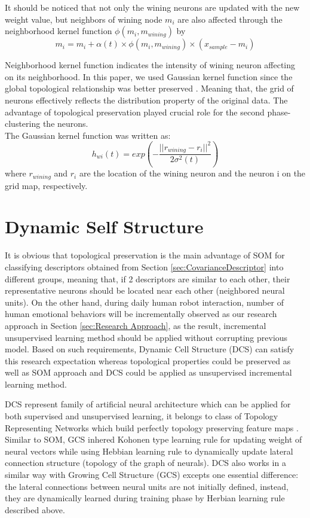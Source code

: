 It should be noticed that not only the wining neurons are updated with the new weight value, but neighbors of wining node $m_{i}$ are also affected through the neighborhood kernel function $\phi(m_i,m_{wining})$ by
\begin{equation}
m_{i} = m_{i} + \alpha(t) \times \phi(m_i,m_{wining}) \times (x_{sample}-m_{i})
\end{equation}

Neighborhood kernel function indicates the intensity of wining neuron affecting on its neighborhood. In this paper, we used Gaussian kernel function since the global topological relationship was better preserved \cite{fang2011topology}. Meaning that, the grid of neurons effectively reflects the distribution property of the original data. The advantage of topological preservation played crucial role for the second phase-clustering the neurons.\\
The Gaussian kernel function was written as:
\begin{equation}
\label{eq:Gaussiankernel}
h_{wi}(t)=exp\left(-\frac{||r_{wining}-r_i||^2}{2\sigma^2(t)}\right)
\end{equation}
where $r_{wining}$ and $r_i$ are the location of the wining neuron and the neuron i on the grid map, respectively.

\section{Dynamic Self Structure}

It is obvious that topological preservation is the main advantage of SOM for classifying descriptors obtained from Section \ref{sec:CovarianceDescriptor} into different groups, meaning that, if 2 descriptors are similar to each other, their representative neurons should be located near each other (neighbored neural units). On the other hand, during daily human robot interaction, number of human emotional behaviors will be incrementally observed as our research approach in Section \ref{sec:Research Approach}, as the result, incremental unsupervised learning method should be applied without corrupting previous model. Based on such requirements, Dynamic Cell Structure (DCS) \cite{bruske1995dynamic} can satisfy this research expectation whereas topological properties could be preserved as well as SOM approach and DCS could be applied as unsupervised incremental learning method.

DCS represent family of artificial neural architecture which can be applied for both supervised and unsupervised learning, it belongs to class of Topology Representing Networks which build perfectly topology preserving feature maps \cite{ahrns1995line}. Similar to SOM, GCS inhered Kohonen type learning rule \cite{kohonen1990self} for updating weight of neural vectors while using Hebbian learning rule \cite{martinetz1993competitive} to dynamically update lateral connection structure (topology of the graph of neurals). DCS also works in a similar way with Growing Cell Structure (GCS) \cite{fritzke1994growing} excepts one essential difference: the lateral connections between neural units are not initially defined, instead, they are dynamically learned during training phase \cite{bruske1995dynamic} by Herbian learning rule described above. 

